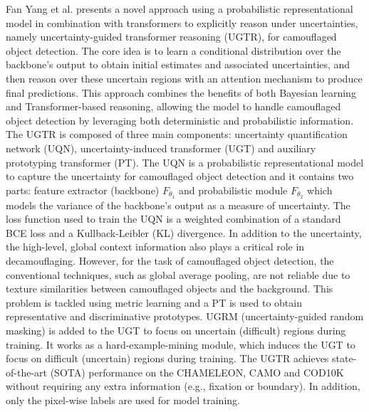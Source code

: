 \documentclass[conference]{IEEEtran}
\begin{document}
Fan Yang et al. \cite{9710683} presents a novel approach using a probabilistic representational model in combination with transformers to explicitly reason under uncertainties, namely uncertainty-guided transformer reasoning (UGTR), for camouflaged object detection. The core idea is to learn a conditional distribution over the backbone’s output to obtain initial estimates and associated uncertainties, and then reason over these uncertain regions with an attention mechanism to produce final predictions. This approach combines the benefits of both Bayesian learning and Transformer-based reasoning, allowing the model to handle camouflaged object detection by leveraging both deterministic and probabilistic information. The UGTR is composed of three main components: uncertainty quantification network (UQN), uncertainty-induced transformer (UGT) and auxiliary prototyping transformer (PT). The UQN is a probabilistic representational model to capture the uncertainty for camouflaged object detection and it contains two parts: feature extractor (backbone) $F_{\theta_1}$ and probabilistic module $F_{\theta_2}$ which models the variance of the backbone’s output as a measure of uncertainty.  The loss function used to train the UQN is a weighted combination of a standard BCE loss and a Kullback-Leibler (KL) divergence. In addition to the uncertainty, the high-level, global context information also plays a critical role in decamouflaging. However, for the task of camouflaged object detection, the conventional techniques, such as global average pooling, are not reliable due to texture similarities between camouflaged objects and the background. This problem is tackled using metric learning  and a PT is used to obtain representative and discriminative prototypes. UGRM (uncertainty-guided random masking) is added to the UGT to focus on uncertain (difficult) regions during training. It works as a hard-example-mining module, which induces the UGT to focus on difficult (uncertain) regions during training. The UGTR achieves state-of-the-art (SOTA) performance on the CHAMELEON, CAMO and COD10K without requiring any extra information (e.g., fixation or boundary).  In addition, only the pixel-wise labels are used for model training.
\end{document}
